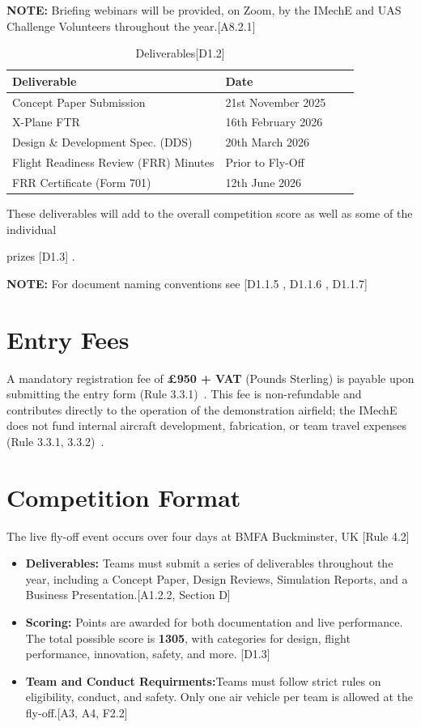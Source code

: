 \documentclass[11pt,a4paper]{article}
\begin{document}
\textbf{NOTE:} Briefing webinars will be provided, on Zoom, by the IMechE and UAS Challenge Volunteers throughout the year.[A8.2.1]

\begin{table}[H]
\centering
\caption{Deliverables[D1.2]}
\label{tab:deadlines}
\begin{tabular}{lllc}
\toprule
\textbf{Deliverable} & \textbf{Date} \\
\midrule
Concept Paper Submission & 21st November 2025 \\
X-Plane FTR & 16th February 2026  \\
Design \& Development Spec. (DDS)& 20th March 2026 \\
Flight Readiness Review (FRR) Minutes & Prior to Fly-Off \\
FRR Certificate (Form 701) & 12th June 2026 \\

\bottomrule
\end{tabular}
\end{table}

\text These deliverables will add to the overall competition score as well as some
of the individual 

prizes [D1.3] .

\textbf{NOTE:}  For document naming conventions see [D1.1.5 , D1.1.6 , D1.1.7]

\section{Entry Fees}
A mandatory registration fee of \textbf{\pounds950 + VAT} (Pounds Sterling) is payable upon submitting the entry form (Rule 3.3.1)~\cite{rules_ref}. This fee is non-refundable and contributes directly to the operation of the demonstration airfield; the IMechE does not fund internal aircraft development, fabrication, or team travel expenses (Rule 3.3.1, 3.3.2)~\cite{rules_ref}.

\section{Competition Format}
The live fly-off event occurs over four days at BMFA Buckminster, UK [Rule 4.2]
\begin{itemize}
    
    \item \textbf{Deliverables:} Teams must submit a series of deliverables throughout the year, including a Concept Paper, Design Reviews, Simulation Reports, and a Business Presentation.[A1.2.2, Section D]
    
    \item \textbf {Scoring:} Points are awarded for both documentation and live performance. The total possible score is \textbf{1305}, with categories for design, flight performance, innovation, safety, and more.  [D1.3]
    \item \textbf{Team and Conduct Requirments:}Teams must follow strict rules on eligibility, conduct, and safety. Only one air vehicle per team is allowed at the fly-off.[A3, A4, F2.2]
\end{itemize}
\end{document}
